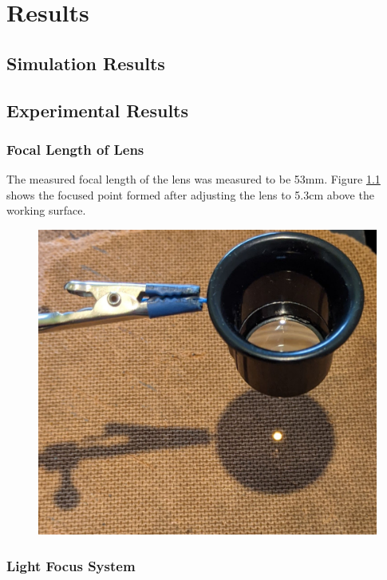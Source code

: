 \chapter{Results}
\label{ch_results}




\section{Simulation Results}


\section{Experimental Results}

\subsection{Focal Length of Lens}

The measured focal length of the lens was measured to be 53mm. Figure \ref{fig:focal_length_experiemnt_result} shows the focused point formed after adjusting the lens to 5.3cm above the working surface.

\begin{figure}[H]
	\centering
	\includegraphics[width=.6\linewidth]{figures/results/focal_length_result.jpg}
	\label{fig:focal_length_experiemnt_result}
\end{figure}


\subsection{Light Focus System}

